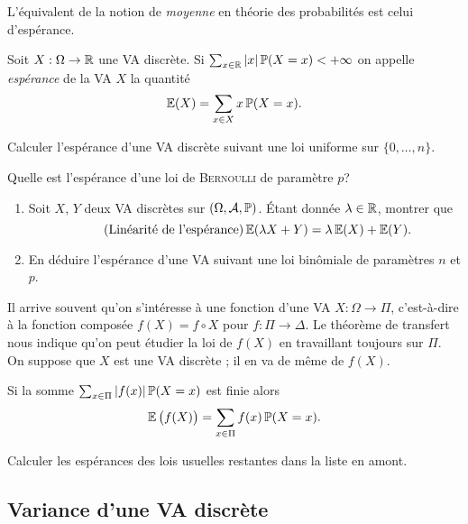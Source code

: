 \documentclass[11pt, a4paper]{article}
\begin{document}
L'équivalent de la notion de \emph{moyenne} en théorie des
probabilités est celui d'espérance.
\begin{defn}
  Soit $X : \Omega \to \mathbb{R}$ une VA discrète. Si
  $\sum_{x\in \mathbb{R}} |x|\operatorname{\mathbb{P}}(X = x) < + \infty$ on appelle
  \emph{espérance} de la VA $X$ la quantité
  \[
    \operatorname{\mathbb{E}}(X) = \sum_{x \in X} x\operatorname{\mathbb{P}}(X = x).
  \]
\end{defn}
\begin{question}
  Calculer l'espérance d'une VA discrète suivant une loi uniforme sur
  $\{0, \ldots, n\}$.
\end{question}
\begin{question}
  Quelle est l'espérance d'une loi de \textsc{Bernoulli} de paramètre $p$?
\end{question}
\begin{question}
  \begin{enumerate}
  \item
    Soit $X$, $Y$ deux VA discrètes sur $(\Omega, \mathcal{A}, \operatorname{\mathbb{P}})$. Étant
    donnée $\lambda \in \mathbb{R}$, montrer que
    \begin{equation}
      \label{eq:linearitesperance}
      \tag{Linéarité de l'espérance}
      \operatorname{\mathbb{E}}(\lambda X + Y) = \lambda\operatorname{\mathbb{E}}(X) + \operatorname{\mathbb{E}}(Y).
    \end{equation}
  \item En déduire l'espérance d'une VA suivant une loi binômiale de
    paramètres $n$ et $p$.
  \end{enumerate}
\end{question}
Il arrive souvent qu'on s'intéresse à une fonction d'une VA
$X : \Omega \to \Pi$, c'est-à-dire à la fonction composée
$f(X) = f\circ X$ pour $f : \Pi \to \Delta$. Le théorème de transfert
nous indique qu'on peut étudier la loi de $f(X)$ en travaillant
toujours sur $\Pi$. On suppose que $X$ est une VA discrète ; il en va
de même de $f(X)$.
\begin{thm}
  Si la somme $\sum_{x \in \Pi}|f(x)|\operatorname{\mathbb{P}}(X = x)$ est finie alors
  \[
    \operatorname{\mathbb{E}}\big(f(X)\big) = \sum_{x \in \Pi}f(x)\operatorname{\mathbb{P}}(X = x).
  \]
\end{thm}
\begin{question}
  Calculer les espérances des lois usuelles restantes dans la liste en
  amont.
\end{question}

\subsection{Variance d'une VA discrète}
\label{sec:varianceVAdiscrete}
\end{document}
